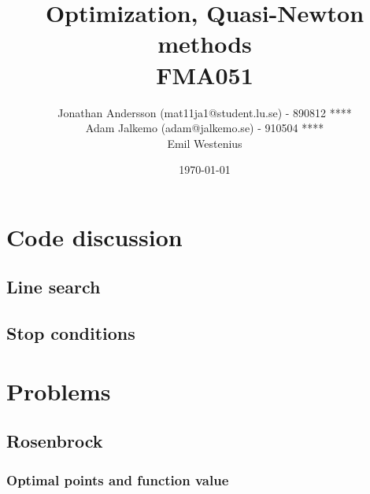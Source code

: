 \documentclass{article}
\begin{document}
\title{Optimization, Quasi-Newton methods\\  FMA051} %

\author{Jonathan Andersson (mat11ja1@student.lu.se) - 890812 **** \\ Adam Jalkemo (adam@jalkemo.se) - 910504 **** \\ Emil Westenius} %

\date{\today} %


\maketitle %
\pagebreak


\section{Code discussion}
\subsection{Line search}

\subsection{Stop conditions}




\section{Problems}
\subsection{Rosenbrock}

\subsubsection{Optimal points and function value}
\end{document}
